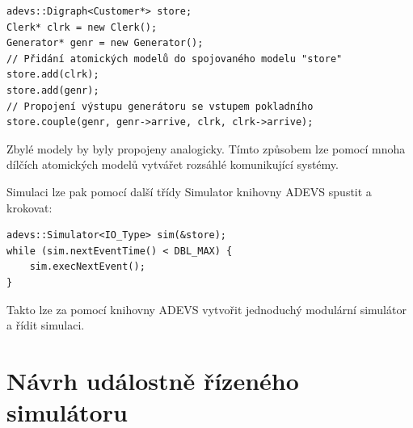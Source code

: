 \begin{lstlisting}
adevs::Digraph<Customer*> store;
Clerk* clrk = new Clerk();
Generator* genr = new Generator();
// Přidání atomických modelů do spojovaného modelu "store"
store.add(clrk); 
store.add(genr);
// Propojení výstupu generátoru se vstupem pokladního
store.couple(genr, genr->arrive, clrk, clrk->arrive);
\end{lstlisting}

Zbylé modely by byly propojeny analogicky. Tímto způsobem lze pomocí mnoha dílčích atomických modelů vytvářet rozsáhlé komunikující systémy.

Simulaci lze pak pomocí další třídy Simulator knihovny ADEVS spustit a krokovat:

\begin{lstlisting}
adevs::Simulator<IO_Type> sim(&store);
while (sim.nextEventTime() < DBL_MAX) {
    sim.execNextEvent();
}
\end{lstlisting}

Takto lze za pomocí knihovny ADEVS vytvořit jednoduchý modulární simulátor a řídit simulaci.

\chapter{Návrh událostně řízeného simulátoru}
\label{navrh}

